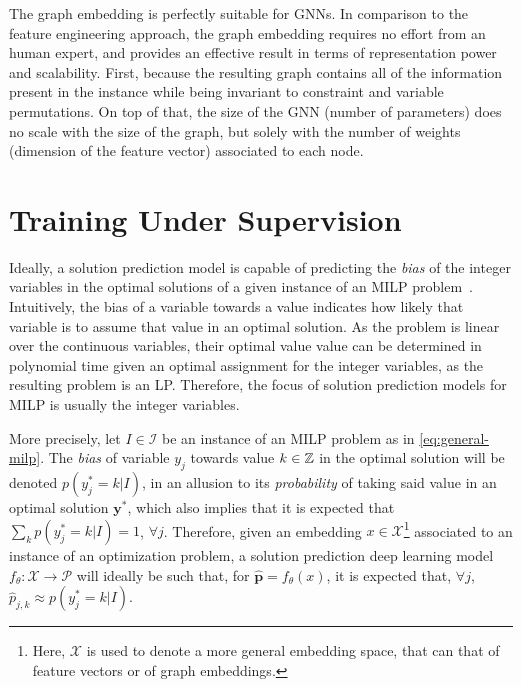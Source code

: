 The graph embedding is perfectly suitable for GNNs.
In comparison to the feature engineering approach, the graph embedding requires no effort from an human expert, and provides an effective result in terms of representation power and scalability.
First, because the resulting graph contains all of the information present in the instance while being invariant to constraint and variable permutations.
On top of that, the size of the GNN (number of parameters) does no scale with the size of the graph, but solely with the number of weights (dimension of the feature vector) associated to each node.


\section{Training Under Supervision}\label{sec:training-solution-prediction}

Ideally, a solution prediction model is capable of predicting the \emph{bias} of the integer variables in the optimal solutions of a given instance of an MILP problem~\cite{khalilMIPGNNDataDrivenFramework2022}.
Intuitively, the bias of a variable towards a value indicates how likely that variable is to assume that value in an optimal solution.
As the problem is linear over the continuous variables, their optimal value value can be determined in polynomial time given an optimal assignment for the integer variables, as the resulting problem is an LP.
Therefore, the focus of solution prediction models for MILP is usually the integer variables.

More precisely, let $I\in \mathcal{I}$ be an instance of an MILP problem as in \eqref{eq:general-milp}.
The \emph{bias} of variable $y_j$ towards value $k\in \mathbb{Z}$ in the optimal solution will be denoted $p(y_j^*=k|I)$, in an allusion to its \emph{probability} of taking said value in an optimal solution $\bm{y}^*$, which also implies that it is expected that $\sum_{k} p(y_j^*=k|I) = 1$, $\forall j$.
Therefore, given an embedding $x\in \mathcal{X}$\footnote{Here, $\mathcal{X}$ is used to denote a more general embedding space, that can that of feature vectors or of graph embeddings.} associated to an instance of an optimization problem, a solution prediction deep learning model $f_{\theta}: \mathcal{X} \longrightarrow \mathcal{P}$ will ideally be such that, for $\hat{\bm{p}}=f_\theta(x)$, it is expected that, $\forall j$, $\hat{p}_{j,k}\approx p(y_j^*=k|I)$.

